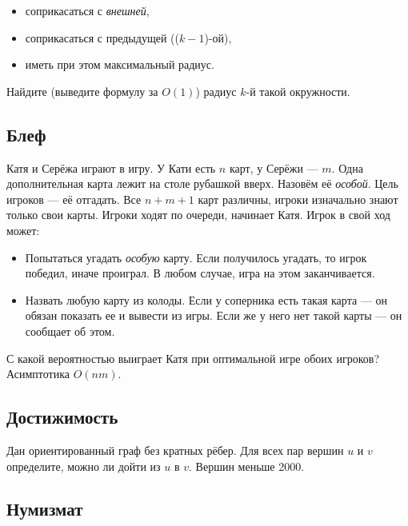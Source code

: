 \documentclass[11pt]{article}
\providecommand{\tightlist}{%
      \setlength{\itemsep}{0pt}\setlength{\parskip}{0pt}}
\begin{document}
\begin{itemize}
\tightlist
\item
  соприкасаться с \emph{внешней},
\item
  соприкасаться с предыдущей ((\(k-1\))-ой),
\item
  иметь при этом максимальный радиус.
\end{itemize}

Найдите (выведите формулу за \(O(1)\)) радиус \(k\)-й такой окружности.

    \subsection{Блеф}\label{ux431ux43bux435ux444}

Катя и Серёжа играют в игру. У Кати есть \(n\) карт, у Серёжи --- \(m\).
Одна дополнительная карта лежит на столе рубашкой вверх. Назовём её
\emph{особой}. Цель игроков --- её отгадать. Все \(n+m+1\) карт
различны, игроки изначально знают только свои карты. Игроки ходят по
очереди, начинает Катя. Игрок в свой ход может:

\begin{itemize}
\tightlist
\item
  Попытаться угадать \emph{особую} карту. Если получилось угадать, то
  игрок победил, иначе проиграл. В любом случае, игра на этом
  заканчивается.
\item
  Назвать любую карту из колоды. Если у соперника есть такая карта ---
  он обязан показать ее и вывести из игры. Если же у него нет такой
  карты --- он сообщает об этом.
\end{itemize}

С какой вероятностью выиграет Катя при оптимальной игре обоих игроков?
Асимптотика \(O(nm)\).

    \subsection{Достижимость}\label{ux434ux43eux441ux442ux438ux436ux438ux43cux43eux441ux442ux44c}

Дан ориентированный граф без кратных рёбер. Для всех пар вершин \(u\) и
\(v\) определите, можно ли дойти из \(u\) в \(v\). Вершин меньше 2000.

    \subsection{Нумизмат}\label{ux43dux443ux43cux438ux437ux43cux430ux442}
\end{document}
